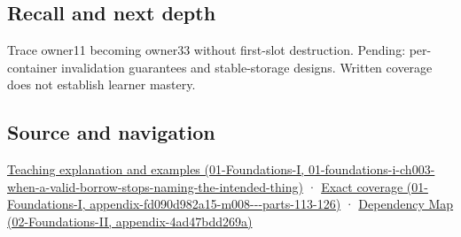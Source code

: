 \subsection{Recall and next depth}\label{appendix-f9b8b9188c7f-recall-and-next-depth}

Trace owner11 becoming owner33 without first-slot destruction. Pending: per-container invalidation guarantees and stable-storage designs. Written coverage does not establish learner mastery.

\subsection{Source and navigation}\label{appendix-f9b8b9188c7f-source-and-navigation}

\href{../01-Foundations-I/main.pdf\#nameddest=01-foundations-i-ch003-when-a-valid-borrow-stops-naming-the-intended-thing}{Teaching explanation and examples (01-Foundations-I, 01-foundations-i-ch003-when-a-valid-borrow-stops-naming-the-intended-thing)} · \href{../01-Foundations-I/main.pdf\#nameddest=appendix-fd090d982a15-m008---parts-113-126}{Exact coverage (01-Foundations-I, appendix-fd090d982a15-m008-\/-\/-parts-113-126)} · \href{../02-Foundations-II/main.pdf\#nameddest=appendix-4ad47bdd269a}{Dependency Map (02-Foundations-II, appendix-4ad47bdd269a)}
